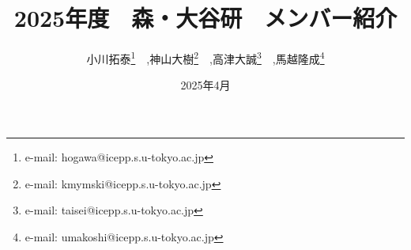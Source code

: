 \title{2025年度　森・大谷研　メンバー紹介}
\date{2025年4月} %
\author{小川拓泰\footnote{e-mail: hogawa@icepp.s.u-tokyo.ac.jp}　,神山大樹\footnote{e-mail: kmymski@icepp.s.u-tokyo.ac.jp}　,高津大誠\footnote{e-mail: taisei@icepp.s.u-tokyo.ac.jp}　,馬越隆成\footnote{e-mail: umakoshi@icepp.s.u-tokyo.ac.jp}} %
\seifuku{} %
